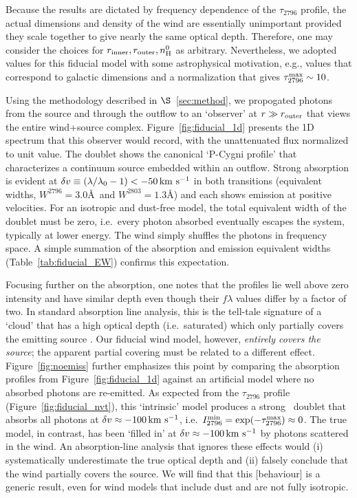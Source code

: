 \documentclass[12pt,preprint]{aastex}
\begin{document}
Because the results are dictated by frequency dependence of the
$\tau_{2796}$ profile, 
the actual dimensions and density of the wind are
essentially unimportant provided they scale together to give nearly the same
optical depth. Therefore, one may consider the choices for
$r_{\rm inner}, r_{\rm outer}, n_{\rm H}^0$ as arbitrary.
Nevertheless, we adopted values for this fiducial model with
some astrophysical motivation,  e.g., values that correspond to
galactic dimensions and a normalization that gives $\tau_{2796}^{\rm
  max} \sim 10$.


Using the methodology described in $\S$~\ref{sec:method}, we
propogated photons from the source and through the outflow to an
`observer' at $r \gg r_{\rm outer}$ that views the entire wind+source
complex.  Figure~\ref{fig:fiducial_1d} presents the 1D spectrum
that this observer would record, with the unattenuated flux
normalized to unit value.   The  doublet
shows the canonical `P-Cygni profile' that characterizes a continuum
source embedded within an outflow.  Strong absorption is evident at
$\delta v  \equiv (\lambda/\lambda_0 - 1) < -50 \, {\rm km~s^{-1}}$ in both transitions (equivalent widths, $W^{2796} =
3.0$\AA\ and $W^{2803} = 1.3$\AA) and each shows emission at
positive velocities.  For an isotropic and dust-free model, the
total equivalent width of the doublet must be zero,
i.e.\ every photon
absorbed eventually escapes the system, typically at lower
energy.  The wind simply shuffles the photons in frequency space.
A simple summation of the absorption and emission equivalent widths
(Table~\ref{tab:fiducial_EW}) confirms this expectation.

Focusing further on the  absorption, one notes that the profiles lie
well above zero intensity and have similar depth even though their $f\lambda$
values differ by a factor of two.  In standard absorption line
analysis, this is 
the tell-tale signature of a `cloud' that has a high optical depth (i.e.\
saturated) which only partially covers the emitting source
\citep[e.g.][]{hammann+10}.  Our fiducial wind model, however, 
{\it entirely covers the source}; the apparent partial covering must
be related to a different effect.
Figure~\ref{fig:noemiss} further emphasizes this point by comparing the 
absorption profiles from Figure~\ref{fig:fiducial_1d} against an
artificial model where no absorbed photons are 
re-emitted.   As expected from the
$\tau_{2796}$ profile (Figure~\ref{fig:fiducial_nvt}), this
`intrinsic' model
produces a strong \mgiid\ doublet that absorbs all photons at
$\delta v \approx -100 \, {\rm km~s^{-1}}$, i.e.\ $I_{2796}^{\rm min} = \exp(-\tau^{\rm
  max}_{2796}) \approx 0$.
The true model, in contrast, has been `filled in' at $\delta v \approx -100
\, {\rm km~s^{-1}}$ by photons scattered in the wind.  An
absorption-line analysis that ignores these effects
would (i) systematically underestimate the true optical
depth and (ii) falsely conclude that the wind partially covers the
source.  We will find that this
[behaviour] is a generic result, even for wind models that include
dust and are not fully isotropic.
\end{document}
